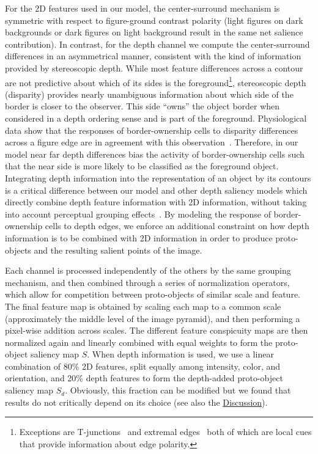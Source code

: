 For the 2D features used in our model, the center-surround mechanism is symmetric with respect to figure-ground contrast polarity (\eg light figures on dark backgrounds or dark figures on light background result in the same net salience contribution). In contrast, for the depth channel we compute the center-surround differences in an asymmetrical manner, consistent with the kind of information provided by stereoscopic depth. While most feature differences across a contour are not predictive about which of its sides is the foreground\footnote{Exceptions are T-junctions~\citep{Heitger_vonderHeydt93} and extremal edges~\citep{Palmer_Ghose08,Ramenahalli_etal11a,Ramenahalli_etal12a,Ramenahalli_etal14a} both of which are local cues that provide information about edge polarity.\label{EEfootnote}}, stereoscopic depth (disparity) provides nearly unambiguous information about which side of the border is closer to the observer. This side ``owns'' the object border when considered in a depth ordering sense and is part of the foreground. Physiological data show that the responses of border-ownership cells to disparity differences across a figure edge are in agreement with this observation~\citep{Zhou_etal00,Qiu_vonderHeydt05}. Therefore, in our model near \vs far depth differences bias the activity of border-ownership cells such that the near side is more likely to be classified as the foreground object. Integrating depth information into the representation of an object by its contours is a critical difference between our model and other depth saliency models which directly combine depth feature information with 2D information, without taking into account perceptual grouping effects~\cite[\eg][]{Ouerhani_etal00,Jost_etal04,Hugli_etal05}. By modeling the response of border-ownership cells to depth edges, we enforce an additional constraint on how depth information is to be combined with 2D information in order to produce proto-objects and the resulting salient points of the image.

Each channel is processed independently of the others by the same grouping mechanism, and then combined through a series of normalization operators, which allow for competition between proto-objects of similar scale and feature. The final feature map is obtained by scaling each map to a common scale (approximately the middle level of the image pyramid), and then performing a pixel-wise addition across scales. The different feature conspicuity maps are then normalized again and linearly combined with equal weights to form the proto-object saliency map $S$. When depth information is used, we use a linear combination of 80\% 2D features, split equally among intensity, color, and orientation, and 20\% depth features to form the depth-added proto-object saliency map $S_d$. Obviously, this fraction can be modified but we found that results do not critically depend on its choice (see also the \hyperref[sec:saliency_discussion]{Discussion}).

